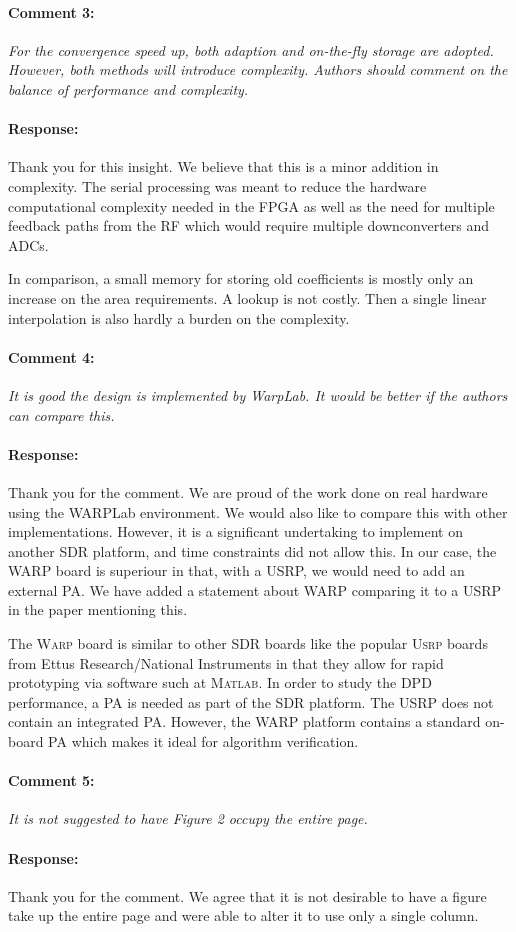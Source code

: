 \documentclass[]{article}
\begin{document}
\paragraph{Comment 3:}\textit{For the convergence speed up, both adaption and on-the-fly storage are adopted. However, both methods will introduce complexity. Authors should comment on the balance of performance and complexity.}
\paragraph{Response:}
Thank you for this insight. We believe that this is a minor addition in complexity. The serial processing was meant to reduce the hardware computational complexity needed in the FPGA as well as the need for multiple feedback paths from the RF which would require multiple downconverters and ADCs.

In comparison, a small memory for storing old coefficients is mostly only an increase on the area requirements. A lookup is not costly. Then a single linear interpolation is also hardly a burden on the complexity.
	
\paragraph{Comment 4:}\textit{It is good the design is implemented by WarpLab. It would be better if the authors can compare this.}
\paragraph{Response:}
Thank you for the comment. We are proud of the work done on real hardware using the WARPLab environment. We would also like to compare this with other implementations. However, it is a significant undertaking to implement on another SDR platform, and time constraints did not allow this. In our case, the WARP board is superiour in that, with a USRP, we would need to add an external PA. We have added a statement about WARP comparing it to a USRP in the paper mentioning this. 

{\color{red} The \textsc{Warp} board is similar to other SDR boards like the popular \textsc{Usrp} boards from Ettus Research/National Instruments in that they allow for rapid prototyping via software such at \textsc{Matlab}. In order to study the DPD performance, a PA is needed as part of the SDR platform. The USRP does not contain an integrated PA. However, the WARP platform contains a standard on-board PA which makes it ideal for algorithm verification.}

\paragraph{Comment 5:}\textit{It is not suggested to have Figure 2 occupy the entire page.}
\paragraph{Response:}
Thank you for the comment. We agree that it is not desirable to have a figure take up the entire page and were able to alter it to use only a single column. 
\end{document}
